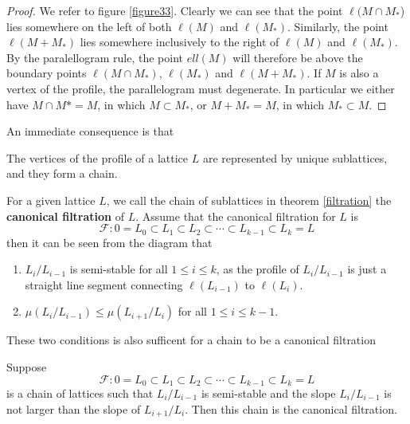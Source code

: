 \begin{proof}
    We refer to figure \ref{figure33}. Clearly we can see that the point $\ell(M\cap M_*$) lies somewhere on the left of both
    $\ell(M)$ and $\ell(M_*)$. Similarly, the point $\ell(M+M_*)$ lies somewhere inclusively to the right of $\ell(M)$ and $\ell(M_*)$.
        By the paralellogram rule, the point $ell(M)$ will therefore be above the boundary points
    $\ell(M\cap M_*)$, $\ell(M_*)$ and $\ell(M+M_*)$. If $M$ is also a vertex of the profile, the parallelogram must degenerate. In particular we either have
    $M \cap M*=M$, in which $M\subset M_*$, or $M+M_* = M$, in which $M_* \subset M$.
\end{proof}
An immediate consequence is that
\begin{theorem}\label{filtration}\cite[Theorem 1.18]{MR780079}
    The vertices of the profile of a lattice $L$ are represented by unique sublattices, and they form a chain.
\end{theorem}
For a given lattice $L$, we call the chain of sublattices in theorem \ref{filtration} the \textbf{canonical filtration} of $L$. Assume that the canonical filtration for $L$
is
\[\mathcal{F}: 0 = L_0 \subset L_1 \subset L_2 \subset \cdots \subset L_{k-1} \subset L_k = L \]
then it can be seen from the diagram that
\begin{enumerate}
    \item $L_i/L_{i-1}$ is semi-stable for all $1 \le i \le k$, as the profile of $L_i/L_{i-1}$  is just a straight line segment connecting $\ell(L_{i-1})$ to $\ell(L_i)$.
    \item $\mu(L_i/L_{i-1}) \le \mu(L_{i+1}/L_i)$ for all $1 \le i \le k-1$.
\end{enumerate}
These two conditions is also sufficent for a chain to be a canonical filtration
\begin{theorem}\label{Grayson's criterion}\cite[Corollary 1.30]{MR780079}
    Suppose
    \[\mathcal{F}: 0 = L_0 \subset L_1 \subset L_2 \subset \cdots \subset L_{k-1} \subset L_k = L \]
    is a chain of lattices such that $L_i/L_{i-1}$ is semi-stable and the slope $L_i/L_{i-1}$ is not larger than the slope of $L_{i+1}/L_i$.
    Then this chain is the canonical filtration.
\end{theorem}
